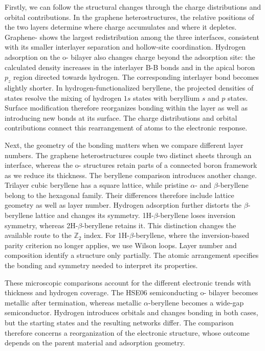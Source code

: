 Firstly, we can follow the structural changes through the charge distributions and orbital contributions.
In the graphene heterostructures, the relative positions of the two layers determine where charge accumulates and where it depletes.
Graphene- shows the largest redistribution among the three interfaces, consistent with its smaller interlayer separation and hollow-site coordination.
Hydrogen adsorption on the o- bilayer also changes charge beyond the adsorption site: the calculated density increases in the interlayer B-B bonds and in the apical boron $p_z$ region directed towards hydrogen.
The corresponding interlayer bond becomes slightly shorter.
In hydrogen-functionalized beryllene, the projected densities of states resolve the mixing of hydrogen $1s$ states with beryllium $s$ and $p$ states.
Surface modification therefore reorganizes bonding within the layer as well as introducing new bonds at its surface.
The charge distributions and orbital contributions connect this rearrangement of atoms to the electronic response.

Next, the geometry of the bonding matters when we compare different layer numbers.
The graphene heterostructures couple two distinct sheets through an interface, whereas the o- structures retain parts of a connected boron framework as we reduce its thickness.
The beryllene comparison introduces another change.
Trilayer cubic beryllene has a square lattice, while pristine $\alpha$- and $\beta$-beryllene belong to the hexagonal family.
Their differences therefore include lattice geometry as well as layer number.
Hydrogen adsorption further distorts the $\beta$-beryllene lattice and changes its symmetry.
1H-$\beta$-beryllene loses inversion symmetry, whereas 2H-$\beta$-beryllene retains it.
This distinction changes the available route to the $\mathbb{Z}_2$ index.
For 1H-$\beta$-beryllene, where the inversion-based parity criterion no longer applies, we use Wilson loops.
Layer number and composition identify a structure only partially.
The atomic arrangement specifies the bonding and symmetry needed to interpret its properties.

These microscopic comparisons account for the different electronic trends with thickness and hydrogen coverage.
The HSE06 semiconducting o- bilayer becomes metallic after termination, whereas metallic $\alpha$-beryllene becomes a wide-gap semiconductor.
Hydrogen introduces orbitals and changes bonding in both cases, but the starting states and the resulting networks differ.
The comparison therefore concerns a reorganization of the electronic structure, whose outcome depends on the parent material and adsorption geometry.

